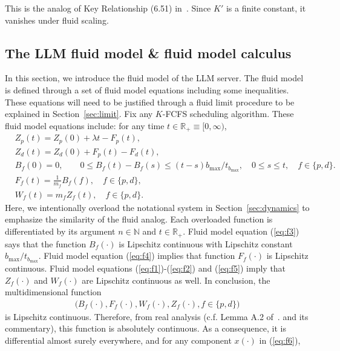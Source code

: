 \documentclass[11pt]{article}
\theoremstyle{plain}
\theoremstyle{definition}
\theoremstyle{remark}
\newcommand{\R}{\mathbb{R}}
\newcommand{\N}{\mathbb{N}}
\begin{document}
This is the analog of Key Relationship (6.51) in~\citep{dai2020processing}. Since $K'$ is a finite constant, it vanishes under fluid scaling.

\subsection{The  LLM  fluid model \& fluid model calculus}
\label{sec:fm}

In this section, we introduce the fluid model of the LLM
server.  The fluid model is defined through a set of fluid
model equations including some inequalities. These equations will need to be justified through a fluid limit procedure to be explained in Section~\ref{sec:limit}. Fix any  $K$-FCFS scheduling algorithm.
These fluid model equations include: for any time $t\in \R_+\equiv[0, \infty)$,
\begin{align}
  &  Z_p(t)=Z_p(0)+ \lambda t - F_p(t), \label{eq:f1} \\
  &  Z_d(t)= Z_d(0)+  F_p(t) - F_d(t),\label{eq:f2} \\
  & B_f(0)=0, \qquad 0\le  B_f(t )-B_f(s) \le (t-s) b_{\max}/t_{b_{\max}}, \quad 0\le  s\le  t,
    \quad f\in\{p, d\}.\label{eq:f3}\\
  &   F_f(t) = \frac{1}{ m_f }B_f(f), \quad f\in \{p, d\}, \label{eq:f4} \\
  &   W_f(t) = m_f Z_f(t), \quad f\in \{p, d\}.   \label{eq:f5}   
\end{align}
Here, we intentionally overload the notational system in Section~\ref{sec:dynamics} to emphasize the similarity of the fluid analog. Each overloaded function is differentiated by its argument $n\in \N$
and $t\in \R_+$.
Fluid model equation (\ref{eq:f3}) says that the function $B_f(\cdot)$
is Lipschitz continuous with Lipschitz constant $b_{\max}/t_{b_{\max}}$.  Fluid model
equation (\ref{eq:f4}) implies that function $F_f(\cdot)$ is Lipschitz
continuous. Fluid model equations (\ref{eq:f1})-(\ref{eq:f2}) and (\ref{eq:f5}) imply that
$Z_f(\cdot)$ and $W_f(\cdot)$ are Lipschitz continuous as well. In conclusion,
the multidimensional function
\begin{align}\label{eq:f6}
  \big(B_f(\cdot), F_f(\cdot), W_f(\cdot), Z_f(\cdot), f\in \{p, d\}\big) 
\end{align}
is Lipschitz continuous. Therefore, from real analysis (c.f. Lemma A.2 of~\citep{dai2020processing}. and its commentary), this function is 
absolutely continuous. As a consequence, it is differential almost surely  everywhere, and for any component  $x(\cdot)$ in (\ref{eq:f6}),
\end{document}
